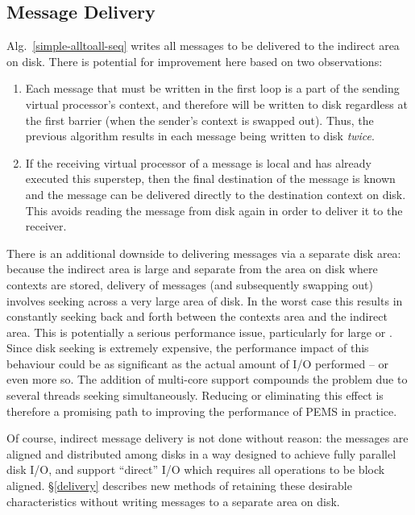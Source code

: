 \documentclass[12pt]{carletoncsthesis}
\begin{document}
\subsection{Message Delivery}
\label{pems1_delivery}


Alg.~\ref{simple-alltoall-seq} writes all messages to be delivered to the
indirect area on disk.  There is potential for improvement here based on two
observations:
\begin{enumerate} 
\item Each message that must be written in the first loop is a part of the
sending virtual processor's context, and therefore will be written to disk
regardless at the first barrier (when the sender's context is swapped out).
Thus, the previous algorithm results in each message being written to disk
{\em twice}.
\item If the receiving virtual processor of a message is local and has already
executed this superstep, then the final destination of the message is known
and the message can be delivered directly to the destination context on disk.
This avoids reading the message from disk again in order to deliver it to
the receiver.
\end{enumerate}

There is an additional downside to delivering messages via a separate disk
area: because the indirect area is large and separate from the area on disk
where contexts are stored, delivery of messages (and subsequently swapping
out) involves seeking across a very large area of disk.  In the worst case
this results in constantly seeking back and forth between the contexts area
and the indirect area.  This is potentially a serious performance issue,
particularly for large  or .  Since disk seeking is extremely
expensive, the performance impact of this behaviour could be as significant
as the actual amount of I/O performed -- or even more so.  The addition
of multi-core support compounds the problem due to several threads seeking
simultaneously.  Reducing or eliminating this effect is therefore a promising
path to improving the performance of PEMS in practice.

Of course, indirect message delivery is not done without reason: the messages
are aligned and distributed among disks in a way designed to achieve fully
parallel disk I/O, and support ``direct'' I/O which requires all operations to
be block aligned.  \S\ref{delivery} describes new methods of retaining these
desirable characteristics without writing messages to a separate area on disk.
\end{document}
